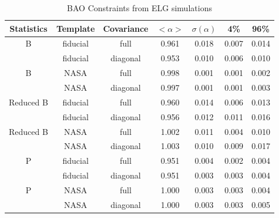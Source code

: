 \begin{table*}
\caption{‌BAO Constraints from ELG simulations}
\begin{center}
\begin{tabular}{ccccccc}
Statistics & Template & Covariance &$< \alpha >$ & $\sigma(\alpha) $ & 4\%&96\%\\
\hline
                            B  &   fiducial & full & 0.961 & 0.018& 0.007 & 0.014\\ 
 &   fiducial & diagonal & 0.953 & 0.010 &0.006 &0.010\\ 
\hline
                            B  &       NASA & full & 0.998 & 0.001& 0.001 & 0.002\\ 
 &       NASA & diagonal & 0.997 & 0.001 &0.001 &0.003\\ 
\hline
                    Reduced B  &   fiducial & full & 0.960 & 0.014& 0.006 & 0.013\\ 
 &   fiducial & diagonal & 0.956 & 0.012 &0.011 &0.016\\ 
\hline
                    Reduced B  &       NASA & full & 1.002 & 0.011& 0.004 & 0.010\\ 
 &       NASA & diagonal & 1.003 & 0.010 &0.009 &0.017\\ 
\hline
                            P  &   fiducial & full & 0.951 & 0.004& 0.002 & 0.004\\ 
 &   fiducial & diagonal & 0.951 & 0.003 &0.003 &0.004\\ 
\hline
                            P  &       NASA & full & 1.000 & 0.003& 0.003 & 0.004\\ 
 &       NASA & diagonal & 1.000 & 0.003 &0.003 &0.005
\end{tabular}
\end{center}
\label{default}
\end{table*}






